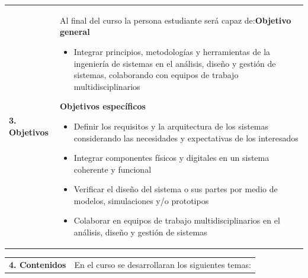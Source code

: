 \documentclass[letterpaper]{article}%
\begin{document}
\vspace*{4mm}%
\newline%
\begin{tabularx}{\textwidth}{p{3cm}p{13cm}}%
\par\fontsize{12}{14}\selectfont \textbf{\textcolor{parte}{3. Objetivos}}&Al final del curso la persona estudiante será capaz de:\newline\newline \textbf{Objetivo general}\begin{itemize}\item Integrar principios, metodologías y herramientas de la ingeniería de sistemas en el análisis, diseño y gestión de sistemas, colaborando con equipos de trabajo multidisciplinarios\end{itemize} \vspace{2mm}\textbf{Objetivos específicos}\begin{itemize}\item Definir los requisitos y la arquitectura de los sistemas considerando las necesidades y expectativas de los interesados\item Integrar componentes físicos y digitales en un sistema coherente y funcional\item Verificar el diseño del sistema o sus partes por medio de modelos, simulaciones y/o prototipos\item Colaborar en equipos de trabajo multidisciplinarios en el análisis, diseño y gestión de sistemas\end{itemize}\\%
\end{tabularx}%
\newpage%
\begin{tabularx}{\textwidth}{p{3cm}p{13cm}}%
\par\fontsize{12}{14}\selectfont \textbf{\textcolor{parte}{4. Contenidos}}&En el curso se desarrollaran los siguientes temas:\\%
\end{tabularx}%
\newline%
\end{document}
